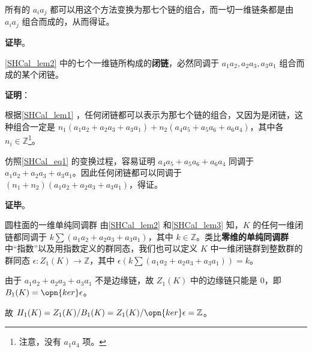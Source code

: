 所有的 $a_ia_j$ 都可以用这个方法变换为那七个链的组合，而一切一维链条都是由 $a_ia_j$ 组合而成的，从而得证。

\textbf{证毕}。

\begin{lemma}{}\label{SHCal_lem3}
\autoref{SHCal_lem2} 中的七个一维链所构成的\textbf{闭链}，必然同调于 $a_1a_2, a_2a_3, a_3a_1$ 组合而成的某个闭链。
\end{lemma}

\textbf{证明}：


根据\autoref{SHCal_lem1} ，任何闭链都可以表示为那七个链的组合，又因为是闭链，这种组合一定是 $n_1(a_1a_2+a_2a_3+a_3a_1)+n_2(a_4a_5+a_5a_6+a_6a_4)$，其中各 $n_i\in\mathbb{Z}$\footnote{注意，没有 $a_1a_4$ 项。}。

仿照\autoref{SHCal_eq1} 的变换过程，容易证明 $a_4a_5+a_5a_6+a_6a_4$ 同调于 $a_1a_2+a_2a_3+a_3a_1$。因此任何闭链都可以同调于 $(n_1+n_2)(a_1a_2+a_2a_3+a_3a_1)$，得证。


\textbf{证毕}。

\begin{corollary}{圆柱面的一维单纯同调群}
由\autoref{SHCal_lem2} 和\autoref{SHCal_lem3} 知，$K$ 的任何一维闭链都同调于 $k\sum (a_1a_2+a_2a_3+a_3a_1)$，其中 $k\in\mathbb{Z}$。类比\textbf{零维的单纯同调群}中“指数”以及用指数定义的群同态，我们也可以定义 $K$ 中一维闭链群到整数群的群同态 $\epsilon: Z_1(K)\to \mathbb{Z}$，其中 $\epsilon(k\sum (a_1a_2+a_2a_3+a_3a_1))=k$。

由于 $a_1a_2+a_2a_3+a_3a_1$ 不是边缘链，故 $Z_1(K)$ 中的边缘链只能是 $0$，即 $B_1(K)=\opn{ker}\epsilon$。

故 $H_1(K)=Z_1(K)/B_1(K)=Z_1(K)/\opn{ker}\epsilon=\mathbb{Z}$。
\end{corollary}



















